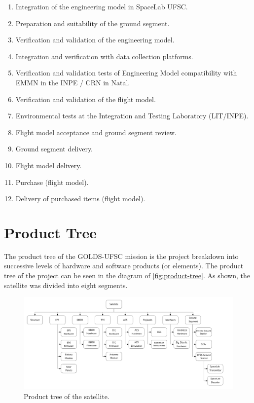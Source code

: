 \begin{enumerate}
    \item Integration of the engineering model in SpaceLab UFSC.
    \item Preparation and suitability of the ground segment.
    \item Verification and validation of the engineering model.
    \item Integration and verification with data collection platforms.
    \item Verification and validation tests of Engineering Model compatibility with EMMN in the INPE / CRN in Natal.
    \item Verification and validation of the flight model.
    \item Environmental tests at the Integration and Testing Laboratory (LIT/INPE).
    \item Flight model acceptance and ground segment review.
    \item Ground segment delivery.
    \item Flight model delivery.
    \item Purchase (flight model).
    \item Delivery of purchased items (flight model).
\end{enumerate}

\section{Product Tree}

The product tree of the GOLDS-UFSC mission is the project breakdown into successive levels of hardware and software products (or elements). The product tree of the project can be seen in the diagram of \autoref{fig:product-tree}. As shown, the satellite was divided into eight segments.

\begin{figure}[!ht]
    \begin{center}
        \includegraphics[width=\textwidth]{figures/product-tree.pdf}
        \caption{Product tree of the satellite.}
        \label{fig:product-tree}
    \end{center}
\end{figure}

